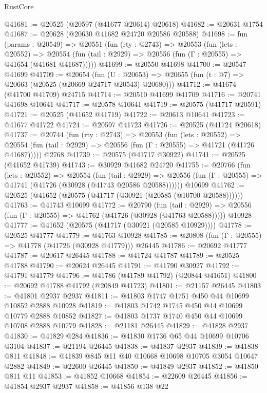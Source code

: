 \begin{lexlean}{RustCore}
\begin{coremodule}
@41681 := @20525 (@20597 (@41677 @20614) @20618)
@41682 := @20631 @1754
@41687 := @20628 (@20630 @41682 @24720 @20586 @20588)
@41698 := fun (params : @20549) =>
  @20551
    (fun (rty : @2743) =>
    @20553
      (fun (lets : @20552) =>
      @20554 (fun (tail : @2929) => @20556 (fun (Γ : @20555) => @41654 (@41681 @41687)))))
@41699 := @20550 @41698
@41700 := @20547 @41699
@41709 := @20654
    (fun (U : @20653) => @20655 (fun (t : @7) => @20663 (@20525 (@20669 @24717 @20543) @20680)))
@41712 := @41674 (@41700 @41709) @24715
@41714 := @20510 @41699 @41709
@41716 := @20741 @41698 @10641
@41717 := @20578 @10641
@41719 := @20575 (@41717 @20591)
@41721 := @20525 (@41652 @41719)
@41722 := @20613 @10641
@41723 := @41677 @41722
@41724 := @20597 @41723
@41726 := @20525 (@41724 @20618)
@41737 := @20744
    (fun (rty : @2743) =>
    @20553
      (fun (lets : @20552) =>
      @20554 (fun (tail : @2929) => @20556 (fun (Γ : @20555) => @41721 (@41726 @41687)))))
    @2768
@41739 := @20575 (@41717 @30922)
@41741 := @20525 (@41652 @41739)
@41743 := @30929 @41682 @24720
@41755 := @20766
    (fun (lets : @20552) =>
    @20554
      (fun (tail : @2929) =>
      @20556 (fun (Γ : @20555) => @41741 (@41726 (@30928 (@41743 @20586 @20588))))))
    @10699
@41762 := @20525 (@41652 (@20575 (@41717 (@30921 (@20585 (@10700 @20588))))))
@41763 := @41743 @10699
@41772 := @20790
    (fun (tail : @2929) => @20556 (fun (Γ : @20555) => @41762 (@41726 (@30928 (@41763 @20588)))))
    @10928
@41777 := @41652 (@20575 (@41717 (@30921 (@20585 @10929))))
@41778 := @20525 @41777
@41779 := @41763 @10928
@41785 := @20808 (fun (Γ : @20555) => @41778 (@41726 (@30928 @41779))) @26445
@41786 := @20692 @41777
@41787 := @20617 @26445
@41788 := @41724 @41787
@41789 := @20525 @41788
@41790 := @20624 @26445
@41791 := @41790 @30927
@41792 := @41791 @41779
@41796 := @41786 (@41789 @41792) (@20844 @41651)
@41800 := @20692 @41788 @41792 (@20849 @41723)
@41801 := @21157 @26445
@41803 := @41801 @2937 @2937
@41811 := @41803 @1747 @1751 @450 @44 @10699 @10852 @2888 @10928
@41819 := @41803 @1742 @1745 @450 @44 @10699 @10779 @2888 @10852
@41827 := @41803 @1737 @1740 @450 @44 @10699 @10708 @2888 @10779
@41828 := @21181 @26445
@41829 := @41828 @2937
@41830 := @41829 @284
@41836 := @41830 @1736 @65 @44 @10699 @10706 @3104
@41837 := @21194 @26445
@41838 := @41837 @2937
@41839 := @41838 @811
@41848 := @41839 @845 @11 @40 @10668 @10698 @10705 @3054 @10647 @2882
@41849 := @22600 @26445
@41850 := @41849 @2937
@41852 := @41850 @811 @11
@41853 := @41852 @10668
@41854 := @22609 @26445
@41856 := @41854 @2937 @2937
@41858 := @41856 @138 @22

\end{coremodule}
\end{lexlean}

